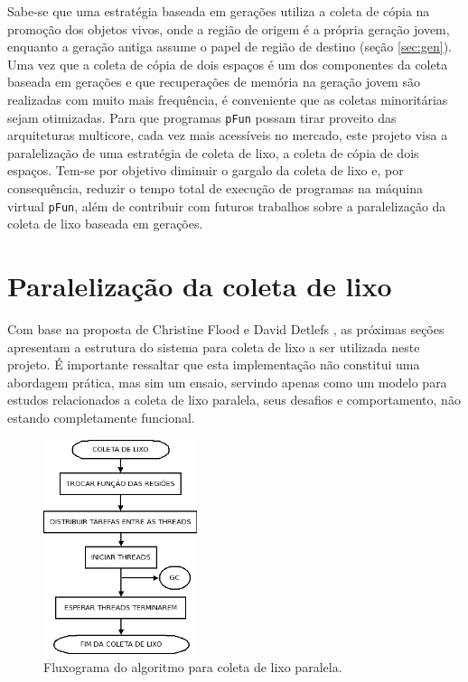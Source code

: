 \documentclass[ccc, pg2]{esinucpel}
\begin{document}
Sabe-se que uma estratégia baseada em gerações utiliza a coleta de cópia na promoção dos objetos vivos, onde a região de origem é a própria geração jovem, enquanto a geração antiga assume o papel de região de destino (seção \ref{sec:gen}). Uma vez que a coleta de cópia de dois espaços é um dos componentes da coleta baseada em gerações e que recuperações de memória na geração jovem são realizadas com muito mais frequência, é conveniente que as coletas minoritárias sejam otimizadas. Para que programas {\tt pFun} possam tirar proveito das arquiteturas multicore, cada vez mais acessíveis no mercado, este projeto visa a paralelização de uma estratégia de coleta de lixo, a coleta de cópia de dois espaços. Tem-se por objetivo diminuir o gargalo da coleta de lixo e, por consequência, reduzir o tempo total de execução de programas na máquina virtual {\tt pFun}, além de contribuir com futuros trabalhos sobre a paralelização da coleta de lixo baseada em gerações. %


\section{Paralelização da coleta de lixo}
Com base na proposta de Christine Flood e David Detlefs \cite{bib:flood:pargc}, as próximas seções apresentam a estrutura do sistema para coleta de lixo a ser utilizada neste projeto. É importante ressaltar que esta implementação não constitui uma abordagem prática, mas sim um ensaio, servindo apenas como um modelo para estudos relacionados a coleta de lixo paralela, seus desafios e comportamento, não estando completamente funcional. %

\begin{figure}[h]
\centering
\includegraphics[width=0.4\textwidth]{images/gc_flow1.png}
\caption{Fluxograma do algoritmo para coleta de lixo paralela.}
\label{fig:flow1}
\end{figure}
\end{document}
